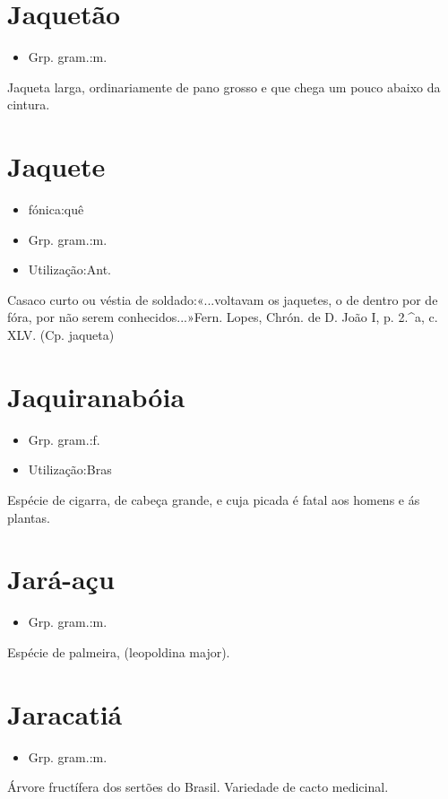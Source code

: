 \documentclass{article}
\begin{document}
\section{Jaquetão}
\begin{itemize}
\item {Grp. gram.:m.}
\end{itemize}
Jaqueta larga, ordinariamente de pano grosso e que chega um pouco abaixo da cintura.
\section{Jaquete}
\begin{itemize}
\item {fónica:quê}
\end{itemize}
\begin{itemize}
\item {Grp. gram.:m.}
\end{itemize}
\begin{itemize}
\item {Utilização:Ant.}
\end{itemize}
Casaco curto ou véstia de soldado:«\textunderscore ...voltavam os jaquetes, o de dentro por de fóra, por não serem conhecidos...\textunderscore »Fern. Lopes, \textunderscore Chrón. de D. João I\textunderscore , p. 2.^a, c. XLV.
(Cp. \textunderscore jaqueta\textunderscore )
\section{Jaquiranabóia}
\begin{itemize}
\item {Grp. gram.:f.}
\end{itemize}
\begin{itemize}
\item {Utilização:Bras}
\end{itemize}
Espécie de cigarra, de cabeça grande, e cuja picada é fatal aos homens e ás plantas.
\section{Jará-açu}
\begin{itemize}
\item {Grp. gram.:m.}
\end{itemize}
Espécie de palmeira, (\textunderscore leopoldina major\textunderscore ).
\section{Jaracatiá}
\begin{itemize}
\item {Grp. gram.:m.}
\end{itemize}
Árvore fructífera dos sertões do Brasil.
Variedade de cacto medicinal.
\end{document}
